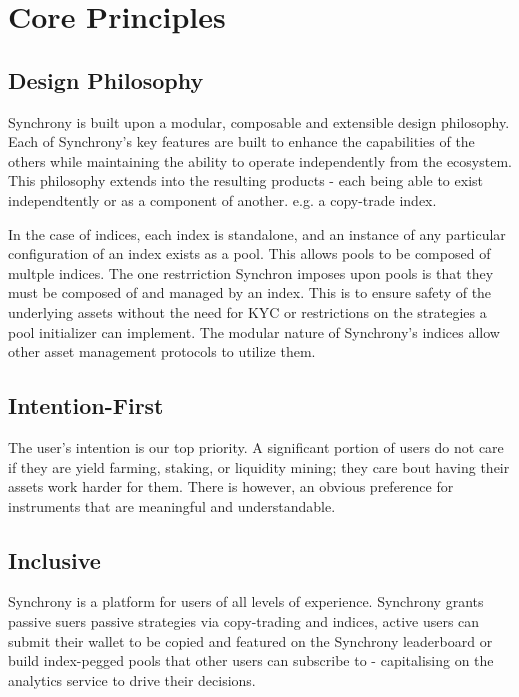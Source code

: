 \documentclass[10pt]{article}
\begin{document}
					\section{Core Principles}
					\subsection{Design Philosophy}
					Synchrony is built upon a modular, composable and extensible design philosophy.
					Each of Synchrony's key features are built to enhance the capabilities of the
					others while maintaining the ability to operate independently from the
					ecosystem. This philosophy extends into the resulting products - each being able
					to exist independtently or as a component of another. e.g. a copy-trade index.
					\par
					In the case of indices, each index is standalone, and an instance of any
					particular configuration of an index exists as a pool. This allows pools to be
					composed of multple indices. The one restrriction Synchron imposes upon pools is
					that they must be composed of and managed by an index. This is to ensure safety
					of the underlying assets without the need for KYC or restrictions on the
					strategies a pool initializer can implement. The modular nature of Synchrony's
					indices allow other asset management protocols to utilize them.
					\subsection{Intention-First}
					The user's intention is our top priority. A significant portion of users do not
					care if they are yield farming, staking, or liquidity mining; they care bout
					having their assets work harder for them. There is however, an obvious
					preference for instruments that are meaningful and understandable.
					\subsection{Inclusive}
					Synchrony is a platform for users of all levels of experience. Synchrony grants
					passive suers passive strategies via copy-trading and indices, active users can
					submit their wallet to be copied and featured on the Synchrony leaderboard or
					build index-pegged pools that other users can subscribe to - capitalising on the
					analytics service to drive their decisions.
\end{document}

